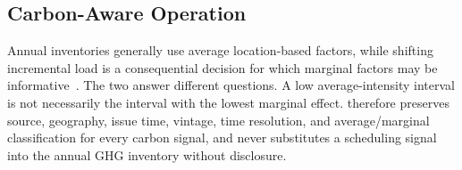 \subsection{Carbon-Aware Operation}

Annual inventories generally use average location-based factors, while shifting incremental load is a consequential decision for which marginal factors may be informative~\cite{hawkes2010marginal}. The two answer different questions. A low average-intensity interval is not necessarily the interval with the lowest marginal effect. \system{} therefore preserves source, geography, issue time, vintage, time resolution, and average/marginal classification for every carbon signal, and never substitutes a scheduling signal into the annual GHG inventory without disclosure.

